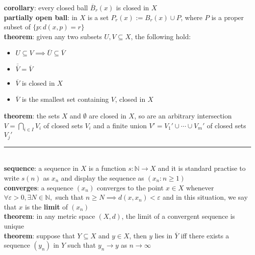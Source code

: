 \documentclass[a4paper]{article}
\newcommand*\closure[1]{\overline{#1}}
\newcommand*\linesep[0]{\noindent\rule{\textwidth}{0.5pt}\\}
\begin{document}
\begin{multicols}{2}
\begin{framed}
	\noindent
	\textbf{corollary}: every closed ball $\closure{B}_r(x)$ is closed in $X$\\
	
	\noindent
	\textbf{partially open ball}: in $X$ is a set $P_r(x) := B_r(x) \cup P$, where $P$ is a proper subset of $\{p : d(x, p) = r \}$\\
	
	\noindent
	\textbf{theorem}: given any two subsets $U, V \subseteq X$, the following hold:

		\begin{itemize}
			\item $U \subseteq V \implies \closure{U} \subseteq \closure{V}$
			\item $\closure{\closure{V}} = \closure{V}$
			\item $\closure{V}$ is closed in $X$
			\item $\closure{V}$ is the smallest set containing $V$, closed in $X$
		\end{itemize}	

	\end{framed}

	\begin{framed}
	\noindent
	\textbf{theorem}: the sets $X$ and $\emptyset$ are closed in $X$, so are an arbitrary intersection $V = \bigcap_{i \in I} V_i$ of closed sets $V_i$ and a finite union $V' = V_1' \cup \cdots \cup V_m'$ of closed sets $V_j'$
	
	\linesep
	\noindent
	\textbf{sequence}: a sequence in $X$ is a function $s: \mathbb{N} \rightarrow X$ and it is standard practise to write $s(n)$ as $x_n$ and display the sequence  as $(x_n : n \geq 1)$\\
	
	\noindent
	\textbf{converges}: a sequence $(x_n)$ converges to the point $x \in X$ whenever $\forall \varepsilon > 0, \exists N \in \mathbb{N},$ such that $n \geq N \implies d(x, x_n) < \varepsilon$ and in this situation, we say that $x$ is the \textbf{limit} of $(x_n)$\\
	
	\noindent
	\textbf{theorem}: in any metric space $(X, d)$, the limit of a convergent sequence is unique\\

	\noindent
	\textbf{theorem}: suppose that $Y \subseteq X$ and $y \in X$, then $y$ lies in $\closure{Y}$ iff there exists a sequence $(y_n)$ in $Y$ such that $y_n \rightarrow y$ as $n \rightarrow \infty$\\


\end{framed}
\end{multicols}
\end{document}
